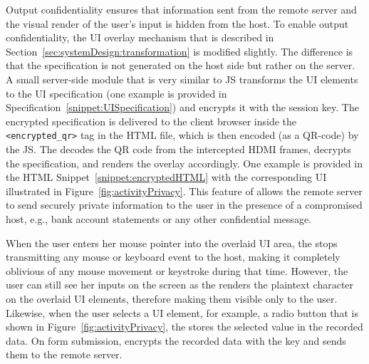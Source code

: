  Output confidentiality ensures that information sent from the remote server and the visual render of the user's input is hidden from the host. To enable output confidentiality, the UI overlay mechanism that is described in Section~\ref{sec:systemDesign:transformation} is modified slightly. The difference is that the specification is not generated on the host side but rather on the server.
A small server-side module that is very similar to \name JS transforms the UI elements to the UI specification (one example is provided in Specification~\ref{snippet:UISpecification}) and encrypts it with the \tls session key. 
The encrypted specification is delivered to the client browser inside the \texttt{<encrypted\_qr>} tag in the HTML file, which is then encoded (as a QR-code) by the \name JS. The \device decodes the QR code from the intercepted HDMI frames, decrypts the specification, and renders the overlay accordingly. One example is provided in the HTML Snippet~\ref{snippet:encryptedHTML} with the corresponding UI illustrated in Figure~\ref{fig:activityPrivacy}. 
This feature of \name allows the remote server to send securely private information to the user in the presence of a compromised host, e.g., bank account statements or any other confidential message. 


 When the user enters her mouse pointer into the overlaid UI area, the \device stops transmitting any mouse or keyboard event to the host, making it completely oblivious of any mouse movement or keystroke during that time. 
However, the user can still see her inputs on the screen as the \device renders the plaintext character on the overlaid UI elements, therefore making them visible only to the user.
Likewise, when the user selects a UI element, for example, a radio button that is shown in Figure~\ref{fig:activityPrivacy}, the \device stores the selected value in the recorded data.
On form submission, \device encrypts the recorded data with the \tls key and sends them to the remote server.

